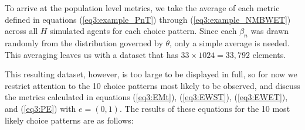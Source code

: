 \documentclass[../main.tex]{subfiles}
\begin{document}
\addtocounter{footnote}{-1}

To arrive at the population level metrics, we take the average of each metric defined in equations (\ref{eq3:example_PnT}) through (\ref{eq3:example_NMBWET}) across all $H$ simulated agents for each choice pattern.
Since each $\beta_n$ was drawn randomly from the distribution governed by $\theta$, only a simple average is needed.
This averaging leaves us with a dataset that has $33 \times 1024 = 33,792$ elements.

This resulting dataset, however, is too large to be displayed in full, so for now we restrict attention to the 10 choice patterns most likely to be observed, and discuss the metrics calculated in equations (\ref{eq3:EMt}), (\ref{eq3:EWST}), (\ref{eq3:EWET}), and (\ref{eq3:PE}) with $e = (0,1)$.
The results of these equations for the 10 most likely choice patterns are as follows:

\break
\end{document}
